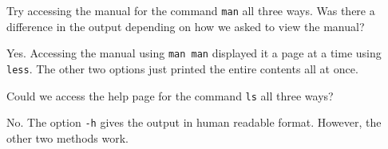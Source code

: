 \documentclass[a4paper,12pt,twoside]{memoir}
\begin{document}
\begin{questions}
Try accessing the manual for the command \texttt{man} all three ways. 
Was there a difference in the output depending on how we asked to view the manual?\\
\begin{answer}
Yes.
Accessing the manual using \texttt{man man} displayed it a page at a time using \texttt{less}.
The other two options just printed the entire contents all at once.\\
\end{answer}


Could we access the help page for the command \texttt{ls} all three ways? \\
\begin{answer}
No.
The option \texttt{-h} gives the output in human readable format.
However, the other two methods work.\\
\end{answer}
\end{questions}
\end{document}
